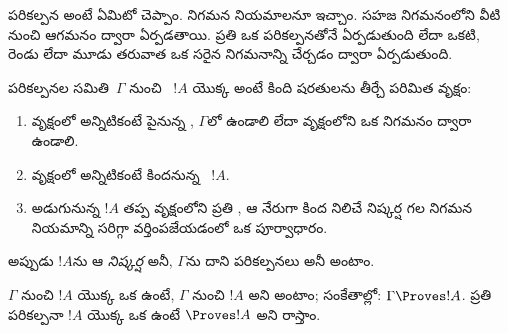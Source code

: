 \documentclass[../../../include/open-logic-section]{subfiles}
\begin{document}
      {}
      {}


\begin{explain}
పరికల్పన అంటే ఏమిటో చెప్పాం. నిగమన నియమాలనూ ఇచ్చాం. సహజ నిగమనంలోని
 వీటి నుంచి ఆగమనం ద్వారా ఏర్పడతాయి. ప్రతి
 ఒక పరికల్పనతోనే ఏర్పడుతుంది లేదా ఒకటి,
రెండు లేదా మూడు  తరువాత ఒక సరైన నిగమనాన్ని చేర్చడం ద్వారా ఏర్పడుతుంది.
\end{explain}

\begin{defn}
పరికల్పనల సమితి~$\Gamma$ నుంచి ~$!A$ యొక్క
\emph{ } అంటే కింది షరతులను తీర్చే
 పరిమిత వృక్షం:
\begin{enumerate}
\item వృక్షంలో అన్నిటికంటే పైనున్న , $\Gamma$లో ఉండాలి
  లేదా వృక్షంలోని ఒక నిగమనం ద్వారా  ఉండాలి.
\item వృక్షంలో అన్నిటికంటే కిందనున్న ~$!A$.
\item అడుగునున్న $!A$ తప్ప వృక్షంలోని ప్రతి , ఆ
   నేరుగా
  కింద నిలిచే నిష్కర్ష గల నిగమన నియమాన్ని సరిగ్గా వర్తింపజేయడంలో ఒక
  పూర్వాధారం.
\end{enumerate}
అప్పుడు $!A$ను ఆ  \emph{నిష్కర్ష} అనీ,
$\Gamma$ను దాని  పరికల్పనలు అనీ అంటాం.

$\Gamma$ నుంచి $!A$ యొక్క ఒక  ఉంటే, $\Gamma$ నుంచి
$!A$ \emph{} అని అంటాం; సంకేతాల్లో: $\Gamma \Proves
!A$. ప్రతి పరికల్పనా  $!A$ యొక్క ఒక 
ఉంటే $\Proves !A$ అని రాస్తాం.
\end{defn}
\end{document}
